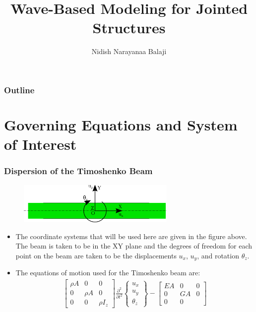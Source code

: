 \documentclass[aspectratio=169]{beamertmd}
\title{Wave-Based Modeling for Jointed Structures}
\author{Nidish Narayanaa Balaji}
\begin{document}
\maketitle{}

\begin{frame}
  \frametitle{Outline}
  \tableofcontents{}
\end{frame}

\section{Governing Equations and System of Interest}
\label{sec:govern-equat-syst}

\begin{frame}[allowframebreaks]
  \frametitle{Dispersion of the Timoshenko Beam}
  \vspace{-0.5cm}\begin{figure}[!h]
    \centering
    \includegraphics[height=2cm]{FIGS/CSYS}
  \end{figure}      
  \begin{itemize}
  \item The coordinate systems that will be used here are given in the
    figure above. The beam is taken to be in the XY plane and the
    degrees of freedom for each point on the beam are taken to be
    the displacements $u_x$, $u_y$, and rotation $\theta_z$.
  \item The equations of motion used for the Timoshenko beam are:
    {\tiny
      \begin{align*}
        \begin{bmatrix} \rho A & 0 & 0\\ 0 & \rho A & 0\\0 & 0 & \rho
          I_z \end{bmatrix} \frac{\partial^2}{\partial
                                                                 t^2}\begin{Bmatrix}
                                                                 u_x\\
                                                                 u_y\\\theta_z \end{Bmatrix}
        - \begin{bmatrix} EA & 0 & 0\\ 0 & GA & 0\\0 & 0 &

\end{bmatrix}
\end{align*}}
\end{itemize}
\end{frame}
\end{document}
